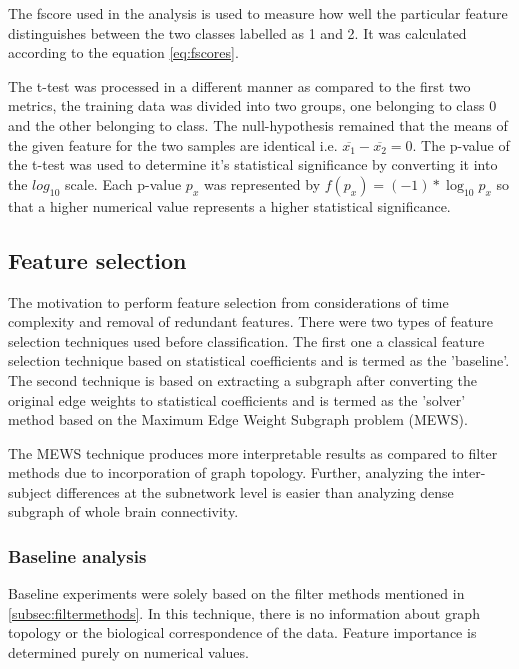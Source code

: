 \documentclass[msthesis.tex]{subfiles}
\begin{document}
The fscore used in the analysis is used to measure how well the particular feature distinguishes between the two classes labelled as 1 and 2. It  was calculated according to the equation \autoref{eq:fscores}. 

The t-test was processed in a different manner as compared to the first two metrics, the training data was divided into two groups, one belonging to class 0 and the other belonging to class. The null-hypothesis remained that the means of the given feature for the two samples are identical i.e. $\overline{x_{1}} - \overline{x_{2}} = 0$. The p-value of the t-test was used to determine it's statistical significance by converting it into the $log_{10}$ scale. Each p-value $p_x$ was represented by $ f(p_{x}) = (-1)*\log_{10} p_x$ so that a higher numerical value represents a higher statistical significance.



\subsection{Feature selection} 
The motivation to perform feature selection from considerations of time complexity and removal of redundant features. There were two types of feature selection techniques used before classification. The first one a classical feature selection technique based on statistical coefficients and is termed as the 'baseline'. The second technique is based on extracting a subgraph after converting the original edge weights to statistical coefficients and is termed as the 'solver' method based on the Maximum Edge Weight Subgraph problem (MEWS). 

The MEWS technique produces more interpretable results as compared to filter methods due to incorporation of graph topology. Further, analyzing the inter-subject differences at the subnetwork level is easier than analyzing dense subgraph of whole brain connectivity. 

\subsubsection{Baseline analysis}

Baseline experiments were solely based on the filter methods mentioned in  \autoref{subsec:filtermethods}. In this technique, there is no information about graph topology or the biological correspondence of the data. Feature importance is determined purely on numerical values.
\end{document}
